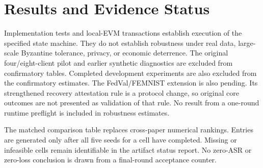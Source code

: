 \section{Results and Evidence Status}
\label{sec:results}





Implementation tests and local-EVM transactions establish execution of the
specified state machine. They do not establish robustness under real data,
large-scale Byzantine tolerance, privacy, or economic deterrence. The original
four/eight-client pilot and earlier synthetic diagnostics are excluded from
confirmatory tables. Completed development experiments are also excluded from
the confirmatory estimates.
The FedVal/FEMNIST extension is also pending. Its strengthened recovery
attestation rule is a protocol change, so original core outcomes are not
presented as validation of that rule. No result from a one-round runtime
preflight is included in robustness estimates.

The matched comparison table replaces cross-paper numerical rankings. Entries
are generated only after all five seeds for a cell have completed. Missing or
infeasible cells remain identifiable in the artifact status report. No zero-ASR
or zero-loss conclusion is drawn from a final-round acceptance counter.
